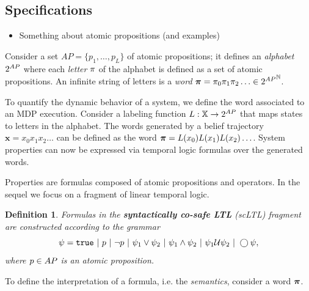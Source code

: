 \documentclass[conference]{IEEEtran}
\newtheorem{definition}{Definition}
\begin{document}
\subsection{Specifications}

\begin{itemize}
  \item Something about atomic propositions (and examples)
\end{itemize}

Consider a set $AP = \{ p_1, \ldots, p_L \}$ of atomic propositions; it defines an \emph{alphabet} ${2^{AP}}$ where each \emph{letter} $\pi$ of the alphabet is defined as a set of atomic propositions. An infinite string of letters is a \emph{word} $\boldsymbol{\pi}=\pi_0\pi_1\pi_2\ldots\in{2^{AP}}^{\mathbb{N}}$.

To quantify the dynamic behavior of a system, we define the word associated to an MDP execution. Consider a labeling function $L: \mathbb{X} \rightarrow {2^{AP}}$ that maps states to letters in the alphabet. The words generated by a belief trajectory $\mathbf{x} = x_0 x_1 x_2 \ldots$ can be defined as the word $\boldsymbol{\pi} = L(x_0)L(x_1) L(x_2) \ldots$. System properties can now be expressed via temporal logic formulas over the generated words.

Properties are formulas composed of atomic propositions and operators. In the sequel we focus on a fragment of linear temporal logic. 
\begin{definition}
  \label{def:gdtl-syntax}
  Formulas in the \textbf{syntactically co-safe LTL} (scLTL) fragment are constructed according to the grammar
  \begin{equation*}
    \label{eq:scLTL}
    \psi =  \True \ |\ p \ |\ \lnot p \ |\ \psi_1 \vee\psi_2  \ |\ \psi_1 \land \psi_2 \ |\ \psi_1 \ltluntil \psi_2 \ |\ \ltlnext \psi,
  \end{equation*}
  where $p\in AP$ is an atomic proposition.
\end{definition}

To define the interpretation of a formula, i.e. the \emph{semantics}, consider a word $\boldsymbol{\pi}$.
\end{document}
